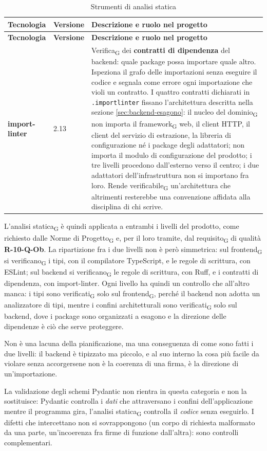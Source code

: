 \documentclass[a4paper, 10pt]{article}
\newenvironment{tabellatec}[2]{%
  \begingroup
  \small
  \setlength{\tabcolsep}{4pt}
  \begin{longtable}{|p{2.8cm}|p{1.5cm}|p{9.2cm}|}
    \caption{#1}\label{#2}\\
    \hline
    \textbf{Tecnologia} & \textbf{Versione} & \textbf{Descrizione e ruolo nel progetto} \\
    \hline
    \endfirsthead
    \hline
    \textbf{Tecnologia} & \textbf{Versione} & \textbf{Descrizione e ruolo nel progetto} \\
    \hline
    \endhead
}{%
  \end{longtable}
  \endgroup
}
\begin{document}
\begin{tabellatec}{Strumenti di analisi statica}{tab:tec-statica}
    \textbf{import-linter} & 2.13 & Verifica\textsubscript{G} dei \textbf{contratti di dipendenza} del backend: quale package possa importare quale altro. Ispeziona il grafo delle importazioni senza eseguire il codice e segnala come errore ogni importazione che violi un contratto. I quattro contratti dichiarati in \texttt{.importlinter} fissano l'architettura descritta nella sezione \ref{sec:backend-esagono}: il nucleo del dominio\textsubscript{G} non importa il framework\textsubscript{G} web, il client HTTP, il client del servizio di estrazione, la libreria di configurazione né i package degli adattatori; non importa il modulo di configurazione del prodotto; i tre livelli procedono dall'esterno verso il centro; i due adattatori dell'infrastruttura non si importano fra loro. Rende verificabile\textsubscript{G} un'architettura che altrimenti resterebbe una convenzione affidata alla disciplina di chi scrive. \\ \hline
\end{tabellatec}

\noindent L'analisi statica\textsubscript{G} è quindi applicata a entrambi i livelli del prodotto, come richiesto dalle Norme di Progetto\textsubscript{G} e, per il loro tramite, dal requisito\textsubscript{G} di qualità \textbf{R-10-Q-Ob}. La ripartizione fra i due livelli non è però simmetrica: sul frontend\textsubscript{G} si verificano\textsubscript{G} i tipi, con il compilatore TypeScript, e le regole di scrittura, con ESLint; sul backend si verificano\textsubscript{G} le regole di scrittura, con Ruff, e i contratti di dipendenza, con import-linter. Ogni livello ha quindi un controllo che all'altro manca: i tipi sono verificati\textsubscript{G} solo sul frontend\textsubscript{G}, perché il backend non adotta un analizzatore di tipi, mentre i confini architetturali sono verificati\textsubscript{G} solo sul backend, dove i package sono organizzati a esagono e la direzione delle dipendenze è ciò che serve proteggere.

Non è una lacuna della pianificazione, ma una conseguenza di come sono fatti i due livelli: il backend è tipizzato ma piccolo, e al suo interno la cosa più facile da violare senza accorgersene non è la coerenza di una firma, è la direzione di un'importazione.

La validazione degli schemi Pydantic non rientra in questa categoria e non la sostituisce: Pydantic controlla i \textit{dati} che attraversano i confini dell'applicazione mentre il programma gira, l'analisi statica\textsubscript{G} controlla il \textit{codice} senza eseguirlo. I difetti che intercettano non si sovrappongono (un corpo di richiesta malformato da una parte, un'incoerenza fra firme di funzione dall'altra): sono controlli complementari.
\end{document}
